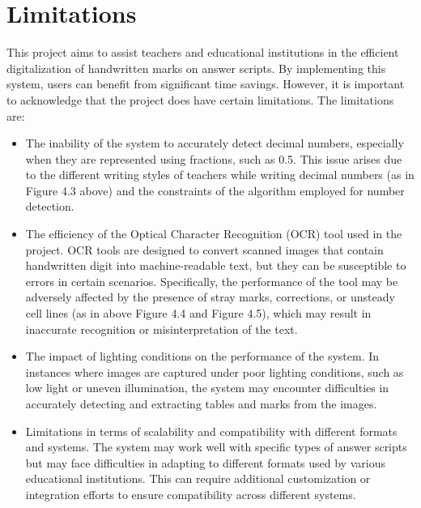 \section{Limitations}

This project aims to assist teachers and educational institutions in the efficient digitalization of handwritten marks on answer scripts. By implementing this system, users can benefit from significant time savings. However, it is important to acknowledge that the project does have certain limitations. The limitations are:

\begin{itemize}
    \item The inability of the system to accurately detect decimal numbers, especially when they are represented using fractions, such as 0.5. This issue arises due to the different writing styles of teachers while writing decimal numbers (as in Figure 4.3 above) and the constraints of the algorithm employed for number detection.

    \item The efficiency of the Optical Character Recognition (OCR) tool used in the project. OCR tools are designed to convert scanned images that contain handwritten digit into machine-readable text, but they can be susceptible to errors in certain scenarios. Specifically, the performance of the tool may be adversely affected by the presence of stray marks, corrections, or unsteady cell lines (as in above Figure 4.4 and Figure 4.5), which may result in inaccurate recognition or misinterpretation of the text.
    
    \item The impact of lighting conditions on the performance of the system. In instances where images are captured under poor lighting conditions, such as low light or uneven illumination, the system may encounter difficulties in accurately detecting and extracting tables and marks from the images.

    \item Limitations in terms of scalability and compatibility with different formats and systems. The system may work well with specific types of answer scripts but may face difficulties in adapting to different formats used by various educational institutions. This can require additional customization or integration efforts to ensure compatibility across different systems.
\end{itemize} 